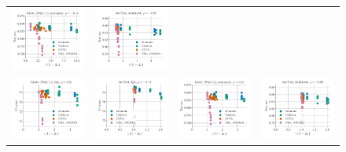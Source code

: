 \begin{figure}
\begin{tabular}{@{\hskip -0.0in}c@{\hskip -0.0in}c@{\hskip -0.0in}c@{\hskip -0.0in}c@{\hskip -0.0in}}
		\includegraphics[width=.245\linewidth]{figures/glove400k_sentiment_sst_test-acc_vs_gram-large-dim-delta1-4-trans_linx_stoc.pdf} &
		\includegraphics[width=.245\linewidth]{figures/fasttext1m_sentiment_sst_test-acc_vs_gram-large-dim-delta1-4-trans_linx_stoc.pdf} \\[-1em]
		\includegraphics[width=.245\linewidth]{figures/glove400k_qa_best-f1_vs_gram-large-dim-delta1-5-trans_linx_stoc.pdf} &
		\includegraphics[width=.245\linewidth]{figures/fasttext1m_qa_best-f1_vs_gram-large-dim-delta1-5-trans_linx_stoc.pdf} &
		\includegraphics[width=.245\linewidth]{figures/glove400k_sentiment_sst_test-acc_vs_gram-large-dim-delta1-5-trans_linx_stoc.pdf} &
		\includegraphics[width=.245\linewidth]{figures/fasttext1m_sentiment_sst_test-acc_vs_gram-large-dim-delta1-5-trans_linx_stoc.pdf} \\[-1em]

\end{tabular}
\end{figure}
